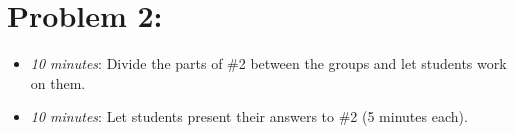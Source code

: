 \documentclass[handout,nooutcomes]{ximera}
\begin{document}
\section*{Problem 2:}

	\begin{itemize}
	
	\item  \emph{10 minutes}:  Divide the parts of \#2 between the groups and let students work on them.
		
	\item  \emph{10 minutes}:  Let students present their answers to \#2 (5 minutes each).
			
	\end{itemize}
	
	
	

	
	
	

	
	

	
	
	

	
	
	
\end{document}
